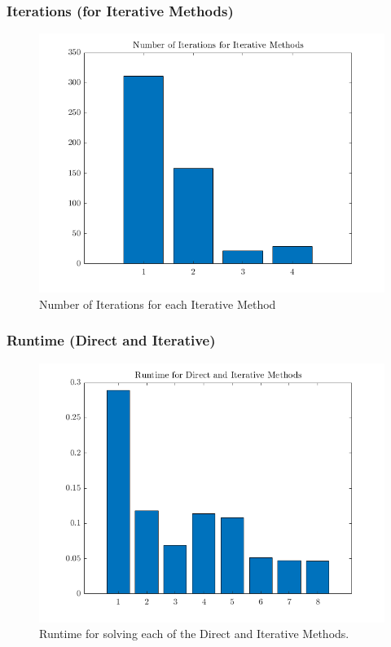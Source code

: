 \documentclass[12pt,a4paper]{article}
\begin{document}
\subsubsection{Iterations (for Iterative Methods)}
\begin{figure}[H]
	\includegraphics[width=\linewidth]{images/IterationsGraph.png}
	\caption{Number of Iterations for each Iterative Method}
	\label{fig:iterations}
\end{figure}


\subsubsection{Runtime (Direct and Iterative)}
\begin{figure}[H]
	\includegraphics[width=\linewidth]{images/RuntimeGraph.png}
	\caption{Runtime for solving each of the Direct and Iterative Methods.}
	\label{fig:runtime}
\end{figure}
\end{document}

